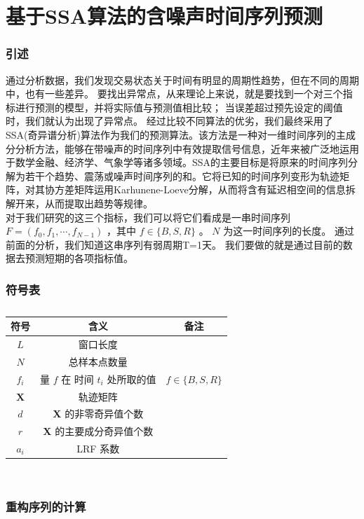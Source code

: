 \documentclass[a4paper]{article}
\begin{document}
\part{基于SSA算法的含噪声时间序列预测}
\section{引述}
\indent 通过分析数据，我们发现交易状态关于时间有明显的周期性趋势，但在不同的周期中，也有一些差异。
要找出异常点，从来理论上来说，就是要找到一个对三个指标进行预测的模型，并将实际值与预测值相比较；
当误差超过预先设定的阈值时，我们就认为出现了异常点。
经过比较不同算法的优劣，我们最终采用了SSA(奇异谱分析)算法作为我们的预测算法。该方法是一种对一维时间序列的主成分分析方法，能够在带噪声的时间序列中有效提取信号信息，近年来被广泛地运用于数学金融、经济学、气象学等诸多领域。SSA的主要目标是将原来的时间序列分解为若干个趋势、震荡或噪声时间序列的和。它将已知的时间序列变形为轨迹矩阵，对其协方差矩阵运用Karhunene-Loeve分解，从而将含有延迟相空间的信息拆解开来，从而提取出趋势等规律。
\\
\indent 对于我们研究的这三个指标，我们可以将它们看成是一串时间序列 $F=(f_0, f_1, \cdots, f_{N-1})$ ，其中 $f \in \{B, S, R\}$ 。
$N$ 为这一时间序列的长度。
通过前面的分析，我们知道这串序列有弱周期T=1天。
我们要做的就是通过目前的数据去预测短期的各项指标值。
\section*{符号表}
\begin{table}[H]
	\centering
	\caption{}
	\label{tab:ssa_symbols}
	\begin{tabular}{ccc}
		\hline
		符号 & 含义 & 备注 \\
		\hline
		$L$ & 窗口长度 & \\
		$N$ & 总样本点数量 & \\
		$f_i$ & 量 $f$ 在 时间 $t_i$ 处所取的值 & $f \in \{B, S, R\}$ \\
		$\textbf{X}$ & 轨迹矩阵 & \\
		$d$ & \textbf{X} 的非零奇异值个数 & \\
		$r$ & \textbf{X} 的主要成分奇异值个数 & \\
		$a_i$ & LRF 系数 & \\
		\hline
	\end{tabular} \\
\end{table}

\section{重构序列的计算}
\end{document}
